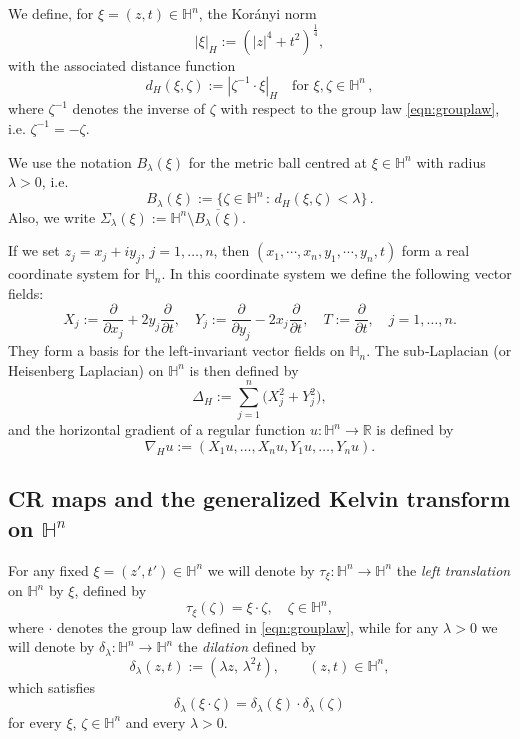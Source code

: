 \documentclass[reqno]{amsart}
\theoremstyle{definition}
\theoremstyle{remark}
\numberwithin{equation}{section}
\begin{document}
We define, for $\xi=(z,t)\in\mathbb{H}^n$, the Kor\'anyi norm
\[
|\xi|_{\! H} :=\left( \vert z\vert^4+ t^2\right)^{\frac{1}{4}},
\]
with the associated distance function
$$
d_{\! H}(\xi,\zeta) := \left\vert \zeta^{-1}\cdot \xi \right\vert_{\! H} \quad \text{for } \xi, \zeta\in\mathbb{H}^n\, ,
$$
where $\zeta^{-1}$ denotes the inverse of $\zeta$ with respect to the group law \eqref{eqn:grouplaw}, 
i.e.  $\zeta^{-1}=-\zeta$.

We use the notation $B_{\lambda}(\xi)$ for the metric ball centred at $\xi\in\mathbb{H}^n$ with radius $\lambda>0$, i.e.
\[
B_{\lambda}(\xi) :=\lbrace \zeta\in\mathbb{H}^n \, : \, d_{\! H}(\xi, \zeta)< \lambda\rbrace\,.
\]
Also, we write $\Sigma_{\lambda}(\xi):=\mathbb{H}^n\setminus \overline{B_{\lambda}(\xi)}$. 


If we set \(z_j = x_j + iy_j\), $j=1,\ldots,n$, then \((x_1, \cdots, x_n, y_1, \cdots, y_n, t)\) form a real coordinate system for \(\mathbb{H}_n\). In this coordinate system we define the following vector fields:
\[
X_j := \frac{\partial}{\partial x_j} + 2y_j \frac{\partial}{\partial t}, \quad 
Y_j := \frac{\partial}{\partial y_j} - 2x_j \frac{\partial}{\partial t}, \quad 
T := \frac{\partial}{\partial t}, \quad j=1,\ldots,n.
\]
They form a basis for the left-invariant vector fields on \(\mathbb{H}_n\). 
The sub‑Laplacian (or Heisenberg Laplacian) on $\mathbb{H}^n$ is then defined by
\[
\Delta_{\! H}:=\sum_{j=1}^{n}\big(X_j^2+Y_j^2\big),
\]
and the horizontal gradient of a regular function $u:\mathbb{H}^n\to \mathbb{R}$ is defined by
\[
\nabla_{\! H} {u}:=(X_1u,\dots,X_nu,Y_1u,\dots,Y_nu).
\]




\subsection{CR maps and the generalized Kelvin transform on $\mathbb{H}^n$}
\label{subsec:CRmaps}

For any fixed $\xi=(z',t')\in\mathbb{H}^n$ we will denote by
$\tau_{\xi}:\mathbb{H}^n\rightarrow\mathbb{H}^n$ the \emph{left translation}
on $\mathbb{H}^n$ by $\xi$, defined by
\begin{equation}\label{trasl}
\tau_{\xi}(\zeta)=\xi\cdot\zeta, \quad \zeta\in \mathbb{H}^n,
\end{equation}
where $\cdot$ denotes the group law defined in \eqref{eqn:grouplaw},
while for any $\lambda>0$ we will denote by
$\delta_\lambda:\mathbb{H}^n\rightarrow\mathbb{H}^n$ the \emph{dilation} defined
by
\begin{equation}\label{dil}
\delta_\lambda(z,t):=(\lambda z,\, \lambda^2 t), \qquad (z,t)\in\mathbb{H}^n,
\end{equation}
which satisfies
$$\delta_\lambda(\xi\cdot\zeta)=\delta_\lambda(\xi)\cdot\delta_\lambda(\zeta)$$
for every $\xi$, $\zeta\in\mathbb{H}^n$ and every $\lambda>0$.
\end{document}
